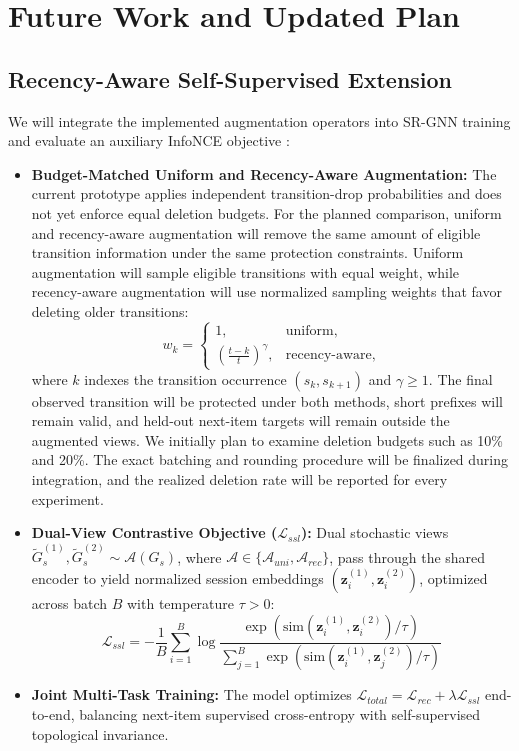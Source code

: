 \documentclass[11pt]{article}
\begin{document}
\section{Future Work and Updated Plan}\label{sec:plan}

\subsection{Recency-Aware Self-Supervised Extension}
We will integrate the implemented augmentation operators into SR-GNN training and evaluate an auxiliary InfoNCE objective \citep{oord2018representation}:
\begin{itemize}[leftmargin=*]
  \item \textbf{Budget-Matched Uniform and Recency-Aware Augmentation:} The current prototype applies independent transition-drop probabilities and does not yet enforce equal deletion budgets. For the planned comparison, uniform and recency-aware augmentation will remove the same amount of eligible transition information under the same protection constraints. Uniform augmentation will sample eligible transitions with equal weight, while recency-aware augmentation will use normalized sampling weights that favor deleting older transitions:
  \begin{equation}
    w_k =
    \begin{cases}
      1, & \text{uniform},\\
      \left(\frac{t-k}{t}\right)^\gamma, & \text{recency-aware},
    \end{cases}
  \end{equation}
  where $k$ indexes the transition occurrence $(s_k,s_{k+1})$ and $\gamma\geq1$. The final observed transition will be protected under both methods, short prefixes will remain valid, and held-out next-item targets will remain outside the augmented views. We initially plan to examine deletion budgets such as 10\% and 20\%. The exact batching and rounding procedure will be finalized during integration, and the realized deletion rate will be reported for every experiment.
  \item \textbf{Dual-View Contrastive Objective ($\mathcal{L}_{ssl}$):} Dual stochastic views $\widetilde{G}_s^{(1)}, \widetilde{G}_s^{(2)} \sim \mathcal{A}(G_s)$, where $\mathcal{A}\in\{\mathcal{A}_{uni},\mathcal{A}_{rec}\}$, pass through the shared encoder to yield normalized session embeddings $(\mathbf{z}_i^{(1)}, \mathbf{z}_i^{(2)})$, optimized across batch $B$ with temperature $\tau > 0$:
  \begin{equation}
    \mathcal{L}_{ssl} = -\frac{1}{B} \sum_{i=1}^B \log \frac{\exp\left(\text{sim}(\mathbf{z}_i^{(1)}, \mathbf{z}_i^{(2)}) / \tau\right)}{\sum_{j=1}^B \exp\left(\text{sim}(\mathbf{z}_i^{(1)}, \mathbf{z}_j^{(2)}) / \tau\right)}
  \end{equation}
  \item \textbf{Joint Multi-Task Training:} The model optimizes $\mathcal{L}_{total} = \mathcal{L}_{rec} + \lambda \mathcal{L}_{ssl}$ end-to-end, balancing next-item supervised cross-entropy with self-supervised topological invariance.
\end{itemize}
\end{document}
